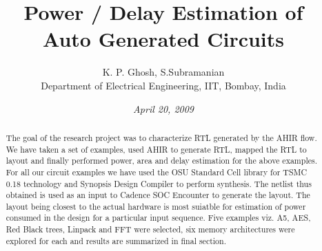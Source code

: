 \documentclass[conference, onecolumn]{IEEEtran}     %
\date{\small\it April 20, 2009}
\title{{Power / Delay Estimation of \\ Auto Generated Circuits}}
\author{ K. P. Ghosh, S.Subramanian \\
{\small Department of Electrical Engineering, IIT, Bombay, India}
 }
\begin{document}
\maketitle
\begin{abstract}

The goal of the research project was to characterize RTL generated by the AHIR flow.
We have taken a set of examples, used AHIR to generate RTL, mapped the RTL to layout and finally performed power, area and delay estimation for the above examples.
For all our circuit examples we have used the OSU Standard Cell library for TSMC 0.18 technology and Synopsis  Design Compiler to perform synthesis.
The netlist thus obtained is used as an input to Cadence SOC Encounter to generate the layout.
The layout being closest to the actual hardware is most suiatble for estimation of power consumed in the design for a particular input sequence.
Five examples viz. A5, AES, Red Black trees, Linpack and FFT were selected, six memory architectures were explored for each and results are summarized in final section.


\end{abstract}










\end{document}
